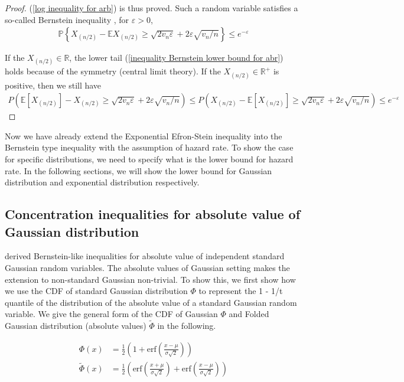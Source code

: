 \documentclass{article}
\theoremstyle{plain}
\begin{document}
\begin{proof}
(\ref{log inequality for arb}) is thus proved. Such a random variable satisfies a so-called Bernstein inequality \cite{boucheron2013}, for $\varepsilon > 0$,
\begin{align}
    \mathbb{P}\left\{X_{(n / 2)}-\mathbb{E} X_{(n / 2)} \geq \sqrt{2 v_{n} \varepsilon}+2 \varepsilon \sqrt{v_{n} / n}\right\} \leq e^{-\varepsilon}
\end{align}

If the $X_{(n/2)} \in \mathbb{R}$, the lower tail (\ref{inequality Bernstein lower bound for abr}) holds because of the symmetry (central limit theory). If the $X_{(n/2)} \in \mathbb{R^+}$ is positive, then we still have
\begin{align}
    P\left( \mathbb{E}[ X_{(n/2)}] - X_{(n/2)} \geq \sqrt{2v_n \varepsilon} + 2 \varepsilon \sqrt{v_n/n} \right) \leq P\left( X_{(n/2)}-\mathbb{E}[ X_{(n/2)}] \geq \sqrt{2v_n \varepsilon} + 2 \varepsilon \sqrt{v_n/n} \right) \leq e^{-\varepsilon}
\end{align}
\end{proof}

Now we have already extend the Exponential Efron-Stein inequality \cite{boucheron2012} into the Bernstein type inequality with the assumption of hazard rate. To show the case for specific distributions, we need to specify what is the lower bound for hazard rate. In the following sections, we will show the lower bound for Gaussian distribution and exponential distribution respectively.

\subsection{Concentration inequalities for absolute value of Gaussian distribution}

\cite{boucheron2012} derived Bernstein-like inequalities for absolute value of independent standard Gaussian random variables. The absolute values of Gaussian setting makes the extension to non-standard Gaussian non-trivial. To show this, we first show how we use the CDF of standard Gaussian distribution $\Phi$ to represent the 1 - 1/t quantile of the distribution of the absolute value of a standard Gaussian random variable. We give the general form of the CDF of Gaussian $\Phi$ and Folded Gaussian distribution (absolute values) $\tilde{\Phi}$ in the following.

\begin{align}
    \Phi(x) &= \frac{1}{2}\left(1 + \text{erf}(\frac{x - \mu}{\sigma \sqrt{2}})\right)\\
    \tilde{\Phi}(x) &= \frac{1}{2}\left(\text{erf}(\frac{x + \mu}{\sigma \sqrt{2}}) + \text{erf}(\frac{x - \mu}{\sigma \sqrt{2}})\right)
\end{align}
\end{document}
